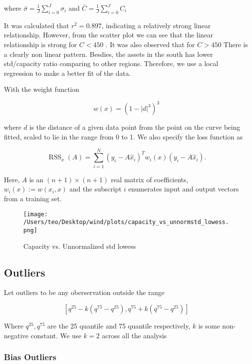 \documentclass[
]{article}
\begin{document}
where \(\bar{\sigma} = \frac{1}{J} \sum_{i = 0}^J \sigma_i\) and
\(\bar{C} = \frac{1}{J} \sum_{i = 0}^J C_i\)

It was calculated that \(r^2 = 0.897\), indicating a relatively strong
linear relationship. However, from the scatter plot we can see that the
linear relationship is strong for \(C < 450\) . It was also observed
that for \(C>450\) There is a clearly non linear pattern. Besdies, the
assets in the south has lower std/capacity ratio comparing to other
regions. Therefore, we use a local regression to make a better fit of
the data.

With the weight function

\[w(x)=\left(1-|d|^{3}\right)^{3}\]

where \(d\) is the distance of a given data point from the point on the
curve being fitted, scaled to lie in the range from 0 to 1. We also
specify the loss function as

\[\operatorname{RSS}_{x}(A)=\sum_{i=1}^{N}\left(y_{i}-A \hat{x}_{i}\right)^{T} w_{i}(x)\left(y_{i}-A \hat{x}_{i}\right) .\]

Here, \(A\) is an \((n+1) \times(n+1)\) real matrix of coefficients,
\(w_{i}(x):=w\left(x_{i}, x\right)\) and the subscript \(i\) enumerates
input and output vectors from a training set.

\begin{figure}
\centering
\texttt{[image: /Users/teo/Desktop/wind/plots/capacity\_vs\_unnormstd\_lowess.png]}
\caption{Capacity vs. Unnormalized std lowess}
\end{figure}

\hypertarget{outliers}{%
\subsection{Outliers}\label{outliers}}

Let outliers to be any oberservation outside the range

\[\left[q^{25}-k\left(q^{75}-q^{25}\right), q^{75}+k\left(q^{75}-q^{25}\right)\right]\]

Where \(q^{25},q^{75}\) are the 25 quantile and 75 quantile
respectively, \(k\) is some non-negative constant. We use \(k=2\) across
all the analysis

\hypertarget{bias-outliers}{%
\subsubsection{Bias Outliers}\label{bias-outliers}}
\end{document}
